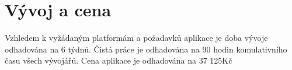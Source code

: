 \documentclass[FM,SP]{tulthesis}
\begin{document}
\section{Vývoj a cena}
Vzhledem k vyžádaným platformám a požadavků aplikace je doba vývoje odhadována na 6 týdnů. Čistá práce je odhadována na 90 hodin komulativního času všech vývojářů. Cena aplikace je odhadována na 37 125Kč

\nocite{*}


\renewcommand{\indexname}{Přehled příkazů, prostředí a voleb}
\printindex


\end{document}
